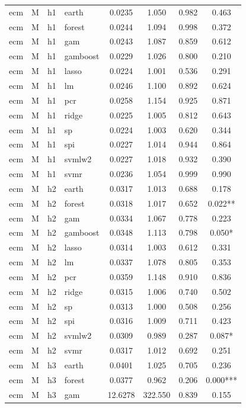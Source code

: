 \begin{ThreePartTable}
\begin{longtable}[t]{llclcccc}
\addlinespace
ecm & M & h1 & earth & 0.0235 & 1.050 & 0.982 & 0.463\\
ecm & M & h1 & forest & 0.0244 & 1.094 & 0.998 & 0.372\\
ecm & M & h1 & gam & 0.0243 & 1.087 & 0.859 & 0.612\\
ecm & M & h1 & gamboost & 0.0229 & 1.026 & 0.800 & 0.210\\
ecm & M & h1 & lasso & 0.0224 & 1.001 & 0.536 & 0.291\\
ecm & M & h1 & lm & 0.0246 & 1.100 & 0.892 & 0.624\\
ecm & M & h1 & pcr & 0.0258 & 1.154 & 0.925 & 0.871\\
ecm & M & h1 & ridge & 0.0225 & 1.005 & 0.812 & 0.643\\
ecm & M & h1 & sp & 0.0224 & 1.003 & 0.620 & 0.344\\
ecm & M & h1 & spi & 0.0227 & 1.014 & 0.944 & 0.864\\
ecm & M & h1 & svmlw2 & 0.0227 & 1.018 & 0.932 & 0.390\\
ecm & M & h1 & svmr & 0.0236 & 1.054 & 0.999 & 0.990\\
\addlinespace
ecm & M & h2 & earth & 0.0317 & 1.013 & 0.688 & 0.178\\
ecm & M & h2 & forest & 0.0318 & 1.017 & 0.652 & 0.022**\\
ecm & M & h2 & gam & 0.0334 & 1.067 & 0.778 & 0.223\\
ecm & M & h2 & gamboost & 0.0348 & 1.113 & 0.798 & 0.050*\\
ecm & M & h2 & lasso & 0.0314 & 1.003 & 0.612 & 0.331\\
ecm & M & h2 & lm & 0.0337 & 1.078 & 0.805 & 0.353\\
ecm & M & h2 & pcr & 0.0359 & 1.148 & 0.910 & 0.836\\
ecm & M & h2 & ridge & 0.0315 & 1.006 & 0.740 & 0.502\\
ecm & M & h2 & sp & 0.0313 & 1.000 & 0.508 & 0.256\\
ecm & M & h2 & spi & 0.0316 & 1.009 & 0.711 & 0.423\\
ecm & M & h2 & svmlw2 & 0.0309 & 0.989 & 0.287 & 0.087*\\
ecm & M & h2 & svmr & 0.0317 & 1.012 & 0.692 & 0.251\\
\addlinespace
ecm & M & h3 & earth & 0.0401 & 1.025 & 0.705 & 0.236\\
ecm & M & h3 & forest & 0.0377 & 0.962 & 0.206 & 0.000***\\
ecm & M & h3 & gam & 12.6278 & 322.550 & 0.839 & 0.155\\

\end{longtable}
\end{ThreePartTable}
